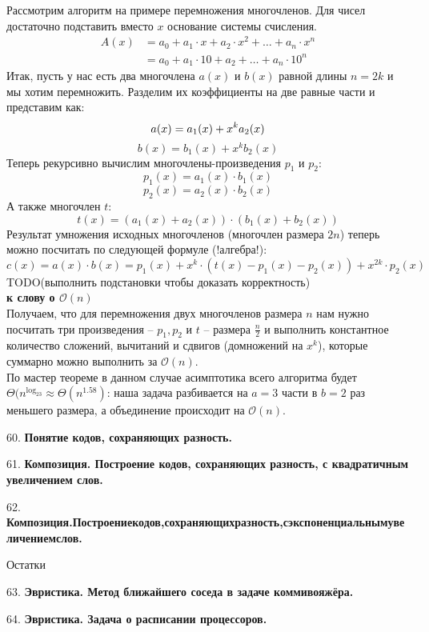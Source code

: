 \documentclass[12pt]{article}
\begin{document}
Рассмотрим алгоритм на примере перемножения многочленов. Для чисел достаточно подставить вместо $x$ основание системы счисления. 
\[
\begin{array}{cl}
    A(x) & = a_0 + a_1 \cdot x + a_2 \cdot x^2 + \dots + a_n \cdot x^n\\
     & = a_0 + a_1 \cdot 10 + a_2 + \dots + a_n \cdot 10^n
\end{array}
\]
Итак, пусть у нас есть два многочлена $a(x)$ и $b(x)$ равной длины $n = 2k$ и мы хотим перемножить. Разделим их коэффициенты на две равные части и представим как:
\[
    a(x) = a_1(x) + x^ka_2(x)\\
\]
\[
    b(x) = b_1(x) + x^kb_2(x)
\]
Теперь рекурсивно вычислим многочлены-произведения $p_1$ и $p_2$:
\[
    p_1(x) = a_1(x)\cdot b_1(x)
\]
\[
    p_2(x) = a_2(x) \cdot b_2(x)
\]
А также многочлен $t$:
\[
    t(x) = (a_1(x) + a_2(x)) \cdot (b_1(x) + b_2(x))
\]
Результат умножения исходных многочленов (многочлен размера $2n$) теперь можно посчитать по следующей формуле (!алгебра!):
\[
    c(x) = a(x)\cdot b(x) = p_1(x) + x^k\cdot (t(x) - p_1(x) - p_2(x)) + x^{2k} \cdot p_2(x)
\]
TODO(выполнить подстановки чтобы доказать корректность)
\\\textbf{к слову о $\mathcal{O}(n)$}\\
Получаем, что для перемножения двух многочленов размера $n$ нам нужно посчитать три произведения -- $p_1, p_2$ и $t$ -- размера $\frac{n}{2}$ и выполнить константное количество сложений, вычитаний и сдвигов (домножений на $x^k$), которые суммарно можно выполнить за $\mathcal{O}(n)$.\\

По мастер теореме в данном случае асимптотика всего алгоритма будет $\Theta(n^{\log_23} \approx \Theta(n^{1.58})$: наша задача разбивается на $a = 3$ части в $b = 2$ раз меньшего размера, а объединение происходит на $\mathcal{O}(n)$. 

60. \textbf{Понятие кодов, сохраняющих разность.}

61. \textbf{Композиция. Построение кодов, сохраняющих разность, с квадратичным увеличением слов.}

62. \textbf{Композиция.Построениекодов,сохраняющихразность,сэкспоненциальнымувеличениемслов.}

\begin{center}
    Остатки
\end{center}

63. \textbf{Эвристика. Метод ближайшего соседа в задаче коммивояжёра.}

64. \textbf{Эвристика. Задача о расписании процессоров.}
\end{document}
